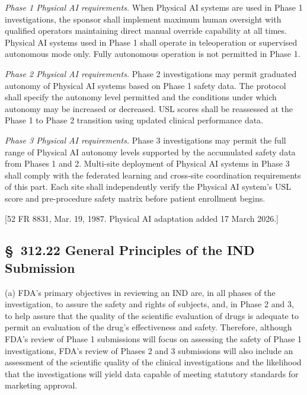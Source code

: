 \begin{description}[leftmargin=0.8cm,style=sameline]
\item[(i)] \textit{Phase 1 Physical AI requirements.} When Physical AI systems are used in Phase 1 investigations, the sponsor shall implement maximum human oversight with qualified operators maintaining direct manual override capability at all times. Physical AI systems used in Phase 1 shall operate in teleoperation or supervised autonomous mode only. Fully autonomous operation is not permitted in Phase 1.
\item[(ii)] \textit{Phase 2 Physical AI requirements.} Phase 2 investigations may permit graduated autonomy of Physical AI systems based on Phase 1 safety data. The protocol shall specify the autonomy level permitted and the conditions under which autonomy may be increased or decreased. USL scores shall be reassessed at the Phase 1 to Phase 2 transition using updated clinical performance data.
\item[(iii)] \textit{Phase 3 Physical AI requirements.} Phase 3 investigations may permit the full range of Physical AI autonomy levels supported by the accumulated safety data from Phases 1 and 2. Multi-site deployment of Physical AI systems in Phase 3 shall comply with the federated learning and cross-site coordination requirements of this part. Each site shall independently verify the Physical AI system's USL score and pre-procedure safety matrix before patient enrollment begins.
\end{description}

[52 FR 8831, Mar. 19, 1987. Physical AI adaptation added 17 March 2026.]

\subsection{\S~312.22 General Principles of the IND Submission}

(a) FDA's primary objectives in reviewing an IND are, in all phases of the investigation, to assure the safety and rights of subjects, and, in Phase 2 and 3, to help assure that the quality of the scientific evaluation of drugs is adequate to permit an evaluation of the drug's effectiveness and safety. Therefore, although FDA's review of Phase 1 submissions will focus on assessing the safety of Phase 1 investigations, FDA's review of Phases 2 and 3 submissions will also include an assessment of the scientific quality of the clinical investigations and the likelihood that the investigations will yield data capable of meeting statutory standards for marketing approval.

